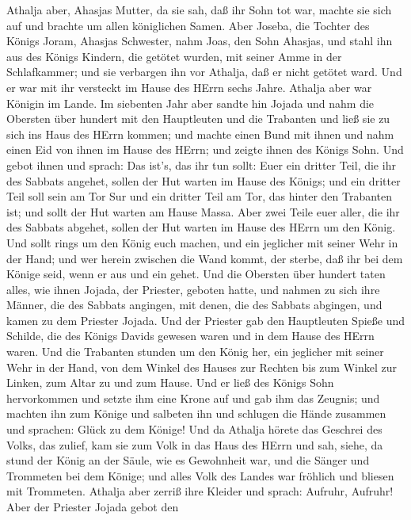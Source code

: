  Athalja aber, Ahasjas Mutter, da sie sah, daß ihr Sohn tot
war, machte sie sich auf und brachte um allen königlichen Samen.
 Aber Joseba, die Tochter des Königs Joram, Ahasjas
Schwester, nahm Joas, den Sohn Ahasjas, und stahl ihn aus des Königs
Kindern, die getötet wurden, mit seiner Amme in der Schlafkammer; und
sie verbargen ihn vor Athalja, daß er nicht getötet ward. 
Und er war mit ihr versteckt im Hause des HErrn sechs Jahre. Athalja
aber war Königin im Lande.  Im siebenten Jahr aber sandte
hin Jojada und nahm die Obersten über hundert mit den Hauptleuten und
die Trabanten und ließ sie zu sich ins Haus des HErrn kommen; und machte
einen Bund mit ihnen und nahm einen Eid von ihnen im Hause des HErrn;
und zeigte ihnen des Königs Sohn.  Und gebot ihnen und
sprach: Das ist's, das ihr tun sollt: Euer ein dritter Teil, die ihr des
Sabbats angehet, sollen der Hut warten im Hause des Königs; 
und ein dritter Teil soll sein am Tor Sur und ein dritter Teil am Tor,
das hinter den Trabanten ist; und sollt der Hut warten am Hause Massa.
 Aber zwei Teile euer aller, die ihr des Sabbats abgehet,
sollen der Hut warten im Hause des HErrn um den König.  Und
sollt rings um den König euch machen, und ein jeglicher mit seiner Wehr
in der Hand; und wer herein zwischen die Wand kommt, der sterbe, daß ihr
bei dem Könige seid, wenn er aus und ein gehet.  Und die
Obersten über hundert taten alles, wie ihnen Jojada, der Priester,
geboten hatte, und nahmen zu sich ihre Männer, die des Sabbats angingen,
mit denen, die des Sabbats abgingen, und kamen zu dem Priester Jojada.
 Und der Priester gab den Hauptleuten Spieße und Schilde,
die des Königs Davids gewesen waren und in dem Hause des HErrn waren.
 Und die Trabanten stunden um den König her, ein jeglicher
mit seiner Wehr in der Hand, von dem Winkel des Hauses zur Rechten bis
zum Winkel zur Linken, zum Altar zu und zum Hause.  Und er
ließ des Königs Sohn hervorkommen und setzte ihm eine Krone auf und gab
ihm das Zeugnis; und machten ihn zum Könige und salbeten ihn und
schlugen die Hände zusammen und sprachen: Glück zu dem Könige!
 Und da Athalja hörete das Geschrei des Volks, das zulief,
kam sie zum Volk in das Haus des HErrn  und sah, siehe, da
stund der König an der Säule, wie es Gewohnheit war, und die Sänger und
Trommeten bei dem Könige; und alles Volk des Landes war fröhlich und
bliesen mit Trommeten. Athalja aber zerriß ihre Kleider und sprach:
Aufruhr, Aufruhr!  Aber der Priester Jojada gebot den
